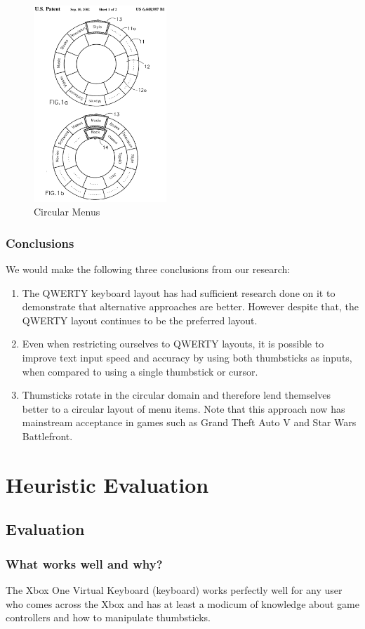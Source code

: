 \documentclass[
	letterpaper, %
]{jdf}
\begin{document}
\begin{figure}[h]
	\centering
	\includegraphics[width=5cm]{jdf-master/Figures/circularmenu.png}
	\caption{Circular Menus}
	\label{fig:circularmanu}
\end{figure}

\subsubsection{Conclusions}
We would make the following three conclusions from our research:
\begin{enumerate}
    \item The QWERTY keyboard layout has had sufficient research done on it to demonstrate that alternative approaches are better. However despite that, the QWERTY layout continues to be the preferred layout.
    \item Even when restricting ourselves to QWERTY layouts, it is possible to improve text input speed and accuracy by using both thumbsticks as inputs, when compared to using a single thumbstick or cursor.
    \item Thumsticks rotate in the circular domain and therefore lend themselves better to a circular layout of menu items. Note that this approach now has mainstream acceptance in games such as Grand Theft Auto V and Star Wars Battlefront.
\end{enumerate}

\section{Heuristic Evaluation}
\subsection{Evaluation}
\subsubsection{What works well and why?}
The Xbox One Virtual Keyboard (keyboard) works perfectly well for any user who comes across the Xbox and has at least a modicum of knowledge about game controllers and how to manipulate thumbsticks.
\end{document}
